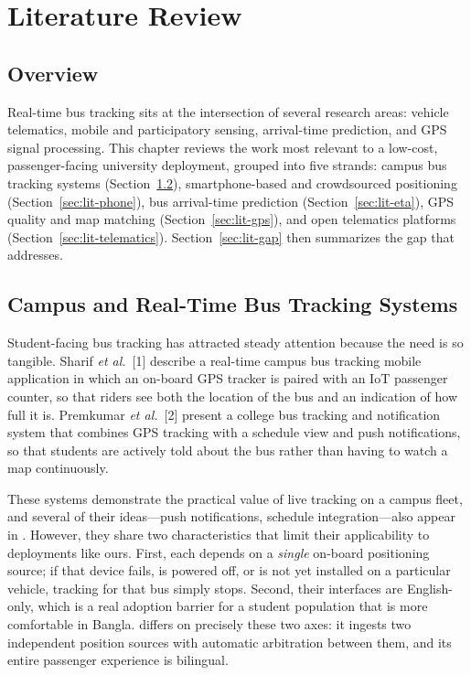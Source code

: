 \chapter{Literature Review}
\label{ch:literature}

\section{Overview}
Real-time bus tracking sits at the intersection of several research
areas: vehicle telematics, mobile and participatory sensing, arrival-time
prediction, and GPS signal processing. This chapter reviews the work most
relevant to a low-cost, passenger-facing university deployment, grouped
into five strands: campus bus tracking systems
(Section~\ref{sec:lit-campus}), smartphone-based and crowdsourced
positioning (Section~\ref{sec:lit-phone}), bus arrival-time prediction
(Section~\ref{sec:lit-eta}), GPS quality and map matching
(Section~\ref{sec:lit-gps}), and open telematics platforms
(Section~\ref{sec:lit-telematics}). Section~\ref{sec:lit-gap} then
summarizes the gap that \system{} addresses.

\section{Campus and Real-Time Bus Tracking Systems}
\label{sec:lit-campus}
Student-facing bus tracking has attracted steady attention because the
need is so tangible. Sharif \emph{et al.}~[1] describe a real-time campus
bus tracking mobile application in which an on-board GPS tracker is paired
with an IoT passenger counter, so that riders see both the location of
the bus and an indication of how full it is. Premkumar \emph{et al.}~[2]
present a college bus tracking and notification system that combines GPS
tracking with a schedule view and push notifications, so that students are
actively told about the bus rather than having to watch a map
continuously.

These systems demonstrate the practical value of live tracking on a
campus fleet, and several of their ideas---push notifications, schedule
integration---also appear in \system{}. However, they share two
characteristics that limit their applicability to deployments like ours.
First, each depends on a \emph{single} on-board positioning source; if
that device fails, is powered off, or is not yet installed on a
particular vehicle, tracking for that bus simply stops. Second, their
interfaces are English-only, which is a real adoption barrier for a
student population that is more comfortable in Bangla. \system{} differs
on precisely these two axes: it ingests two independent position sources
with automatic arbitration between them, and its entire passenger
experience is bilingual.


